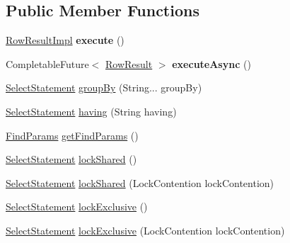 \subsection*{Public Member Functions}
\begin{DoxyCompactItemize}
\item 
\mbox{\label{classcom_1_1mysql_1_1cj_1_1xdevapi_1_1_select_statement_impl_abb681a3ede027c26d58b25f065a9a9e5}} 
\mbox{\hyperlink{classcom_1_1mysql_1_1cj_1_1xdevapi_1_1_row_result_impl}{Row\+Result\+Impl}} {\bfseries execute} ()
\item 
\mbox{\label{classcom_1_1mysql_1_1cj_1_1xdevapi_1_1_select_statement_impl_a8350a43b44c31858c02fcbc4f90f15ee}} 
Completable\+Future$<$ \mbox{\hyperlink{interfacecom_1_1mysql_1_1cj_1_1xdevapi_1_1_row_result}{Row\+Result}} $>$ {\bfseries execute\+Async} ()
\item 
\mbox{\hyperlink{interfacecom_1_1mysql_1_1cj_1_1xdevapi_1_1_select_statement}{Select\+Statement}} \mbox{\hyperlink{classcom_1_1mysql_1_1cj_1_1xdevapi_1_1_select_statement_impl_a88dd14474574f8e6f785aa2341b7c382}{group\+By}} (String... group\+By)
\item 
\mbox{\hyperlink{interfacecom_1_1mysql_1_1cj_1_1xdevapi_1_1_select_statement}{Select\+Statement}} \mbox{\hyperlink{classcom_1_1mysql_1_1cj_1_1xdevapi_1_1_select_statement_impl_a7c95308255a21648ee6bbe698e934552}{having}} (String having)
\item 
\mbox{\hyperlink{interfacecom_1_1mysql_1_1cj_1_1xdevapi_1_1_find_params}{Find\+Params}} \mbox{\hyperlink{classcom_1_1mysql_1_1cj_1_1xdevapi_1_1_select_statement_impl_a887ea3a5dcdb37d2bc6845cfc67631a9}{get\+Find\+Params}} ()
\item 
\mbox{\hyperlink{interfacecom_1_1mysql_1_1cj_1_1xdevapi_1_1_select_statement}{Select\+Statement}} \mbox{\hyperlink{classcom_1_1mysql_1_1cj_1_1xdevapi_1_1_select_statement_impl_a4c2746728bcf0ed59e1604d57f94f8b2}{lock\+Shared}} ()
\item 
\mbox{\hyperlink{interfacecom_1_1mysql_1_1cj_1_1xdevapi_1_1_select_statement}{Select\+Statement}} \mbox{\hyperlink{classcom_1_1mysql_1_1cj_1_1xdevapi_1_1_select_statement_impl_a94383dd2bc539f35e3faa4de023248a1}{lock\+Shared}} (Lock\+Contention lock\+Contention)
\item 
\mbox{\hyperlink{interfacecom_1_1mysql_1_1cj_1_1xdevapi_1_1_select_statement}{Select\+Statement}} \mbox{\hyperlink{classcom_1_1mysql_1_1cj_1_1xdevapi_1_1_select_statement_impl_a53aaa86b0305024bdd172a02e975b006}{lock\+Exclusive}} ()
\item 
\mbox{\hyperlink{interfacecom_1_1mysql_1_1cj_1_1xdevapi_1_1_select_statement}{Select\+Statement}} \mbox{\hyperlink{classcom_1_1mysql_1_1cj_1_1xdevapi_1_1_select_statement_impl_afbaa870747c558133a85fcc536658503}{lock\+Exclusive}} (Lock\+Contention lock\+Contention)
\end{DoxyCompactItemize}
